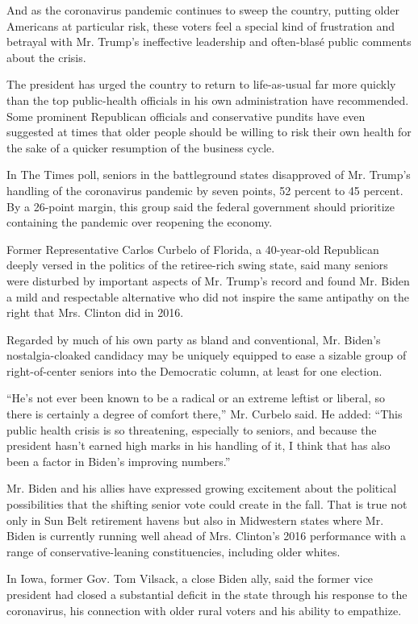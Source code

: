 And as the coronavirus pandemic continues to sweep the country, putting
older Americans at particular risk, these voters feel a special kind of
frustration and betrayal with Mr. Trump's ineffective leadership and
often-blasé public comments about the crisis.

The president has urged the country to return to life-as-usual far more
quickly than the top public-health officials in his own administration
have recommended. Some prominent Republican officials and conservative
pundits have even suggested at times that older people should be willing
to risk their own health for the sake of a quicker resumption of the
business cycle.

In The Times poll, seniors in the battleground states disapproved of Mr.
Trump's handling of the coronavirus pandemic by seven points, 52 percent
to 45 percent. By a 26-point margin, this group said the federal
government should prioritize containing the pandemic over reopening the
economy.

Former Representative Carlos Curbelo of Florida, a 40-year-old
Republican deeply versed in the politics of the retiree-rich swing
state, said many seniors were disturbed by important aspects of Mr.
Trump's record and found Mr. Biden a mild and respectable alternative
who did not inspire the same antipathy on the right that Mrs. Clinton
did in 2016.

Regarded by much of his own party as bland and conventional, Mr. Biden's
nostalgia-cloaked candidacy may be uniquely equipped to ease a sizable
group of right-of-center seniors into the Democratic column, at least
for one election.

``He's not ever been known to be a radical or an extreme leftist or
liberal, so there is certainly a degree of comfort there,'' Mr. Curbelo
said. He added: ``This public health crisis is so threatening,
especially to seniors, and because the president hasn't earned high
marks in his handling of it, I think that has also been a factor in
Biden's improving numbers.''

Mr. Biden and his allies have expressed growing excitement about the
political possibilities that the shifting senior vote could create in
the fall. That is true not only in Sun Belt retirement havens but also
in Midwestern states where Mr. Biden is currently running well ahead of
Mrs. Clinton's 2016 performance with a range of conservative-leaning
constituencies, including older whites.

In Iowa, former Gov. Tom Vilsack, a close Biden ally, said the former
vice president had closed a substantial deficit in the state through his
response to the coronavirus, his connection with older rural voters and
his ability to empathize.

